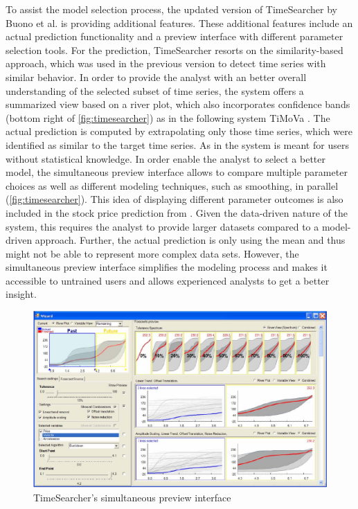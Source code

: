 \documentclass[electronic]{vgtc}             %
\begin{document}
To assist the model selection process, the updated version of TimeSearcher by Buono et al. \cite{buono:2007} is providing additional features.  
These additional features include an actual prediction functionality and a preview interface with different parameter selection tools.
For the prediction, TimeSearcher resorts on the similarity-based approach, which was used in the previous version \cite{buono:2005} to detect time series with similar behavior.
In order to provide the analyst with an better overall understanding of the selected subset of time series, the system offers a summarized view based on a river plot, which also incorporates confidence bands (bottom right of \autoref{fig:timesearcher}) as in the following system TiMoVa \cite{boegl:2013} .
The actual prediction is computed by extrapolating only those time series, which were identified as similar to the target time series.
As in \cite{buono:2005} the system is meant for users without statistical knowledge.
In order enable the analyst to select a better model, the simultaneous preview interface allows to compare multiple parameter choices as well as different modeling techniques, such as smoothing, in parallel (\autoref{fig:timesearcher}).
This idea of displaying different parameter outcomes is also included in the stock price prediction from \cite{ichikawa:2002}.
Given the data-driven nature of the system, this requires the analyst to provide larger datasets compared to a model-driven approach.
Further, the actual prediction is only using the mean and thus might not be able to represent more complex data sets. 
However, the simultaneous preview interface simplifies the modeling process and makes it accessible to untrained users and allows experienced analysts to get a better insight.

\begin{figure}[htb]
	\centering
	\includegraphics[width=\columnwidth]{TimeSearcher}
	\caption{TimeSearcher's \cite{buono:2007} simultaneous preview interface
	}
	\label{fig:timesearcher}
\end{figure}
\end{document}
